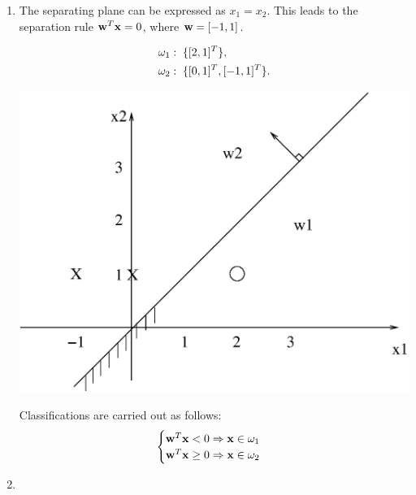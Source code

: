 \begin{enumerate}
\begin{solution}
    \begin{enumerate} 
    \item

      The separating plane can be expressed as $x_1 = x_2$. This leads to
      the separation rule ${\bf{w}}^T {\bf{x}}=0$, where ${\bf{w}}=[-1,1]$.
      
      \begin{align}
        &\omega_1: \text{\;} \{[2,1]^T\}, \notag \\
        &\omega_2: \text{\;} \{[0,1]^T, [-1,1]^T \}. \notag
      \end{align}
      \begin{center}
        \includegraphics[scale=0.35]{e4_5.eps}
      \end{center}

      Classifications are carried out as follows:
      \begin{equation*}
        \begin{cases}
          {\bf{w}}^T{\bf{x}}<0 \Rightarrow {\bf{x}} \in \omega_1\\
          {\bf{w}}^T{\bf{x}}\geq 0 \Rightarrow {\bf{x}} \in \omega_2\\
        \end{cases}
      \end{equation*}

    \item


\end{enumerate}
\end{solution}
\end{enumerate}
